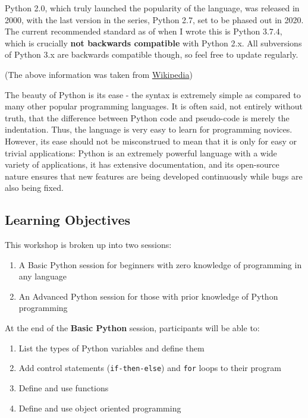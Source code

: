 \documentclass[12pt]{article}
\newcommand{\code}{\texttt}
\begin{document}
Python 2.0, which truly launched the popularity of the language, was released in 2000, with the last version in the series, Python 2.7, set to be phased out in 2020. The current recommended standard as of when I wrote this is Python 3.7.4, which is crucially \textbf{not backwards compatible} with Python 2.x. All subversions of Python 3.x are backwards compatible though, so feel free to update regularly.

(The above information was taken from \href{https://en.wikipedia.org/wiki/Python_(programming_language)}{Wikipedia})

The beauty of Python is its ease - the syntax is extremely simple as compared to many other popular programming languages. It is often said, not entirely without truth, that the difference between Python code and pseudo-code is merely the indentation. Thus, the language is very easy to learn for programming novices. However, its ease should not be misconstrued to mean that it is only for easy or trivial applications: Python is an extremely powerful language with a wide variety of applications, it has extensive documentation, and its open-source nature ensures that new features are being developed continuously while bugs are also being fixed.

\subsection{Learning Objectives}
This workshop is broken up into two sessions:

\begin{enumerate}
	\item A Basic Python session for beginners with zero knowledge of programming in any language
	\item An Advanced Python session for those with prior knowledge of Python programming
\end{enumerate}

At the end of the \textbf{Basic Python} session, participants will be able to:

\begin{enumerate}
	\item List the types of Python variables and define them
	\item Add control statements (\code{if-then-else}) and \code{for} loops to their program
	\item Define and use functions
	\item Define and use object oriented programming
\end{enumerate}
\end{document}
